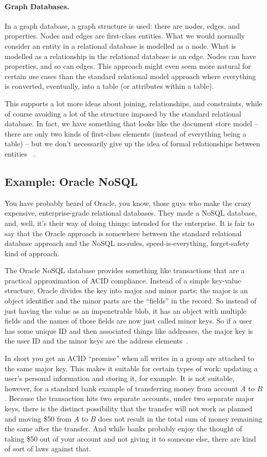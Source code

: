 \paragraph{Graph Databases.}
In a graph database, a graph structure is used: there are nodes, edges, and properties. Nodes and edges are first-class entities. What we would normally consider an entity in a relational database is modelled as a node. What is modelled as a relationship in the relational database is an edge. Nodes can have properties, and so can edges. This approach might even seem more natural for certain use cases than the standard relational model approach where everything is converted, eventually, into a table (or attributes within a table). 

This supports a lot more ideas about joining, relationships, and constraints, while of course avoiding a lot of the structure imposed by the standard relational database. In fact, we have something that looks like the document store model -- there are only two kinds of first-class elements (instead of everything being a table) --  but we don't necessarily give up the idea of formal relationships between entities ~\cite{graphdb}.


\subsection*{Example: Oracle NoSQL}
You have probably heard of Oracle, you know, those guys who make the crazy expensive, enterprise-grade relational databases. They made a NoSQL database, and, well, it's their way of doing things: intended for the enterprise. It is fair to say that the Oracle approach is somewhere between the standard relational database approach and the NoSQL no-rules, speed-is-everything, forget-safety kind of approach. 

The Oracle NoSQL database provides something like transactions that are a practical approximation of ACID compliance. Instead of a simple key-value structure, Oracle divides the key into major and minor parts; the major is an object identifier and the minor parts are the ``fields'' in the record. So instead of just having the value as an impenetrable blob, it has an object with multiple fields and the names of those fields are now just called minor keys. So if a user has some unique ID and then associated things like addresses, the major key is the user ID and the minor keys are the address elements~\cite{oraclenosql}.

In short you get an ACID ``promise'' when all writes in a group are attached to the same major key. This makes it suitable for certain types of work: updating a user's personal information and storing it, for example. It is not suitable, however, for a standard bank example of transferring money from account $A$ to $B$. Because the transaction hits two separate accounts, under two separate major keys, there is the distinct possibility that the transfer will not work as planned and moving \$50 from $A$ to $B$ does not result in the total sum of money remaining the same after the transfer. And while banks probably enjoy the thought of taking \$50 out of your account and not giving it to someone else, there are kind of sort of laws against that.


